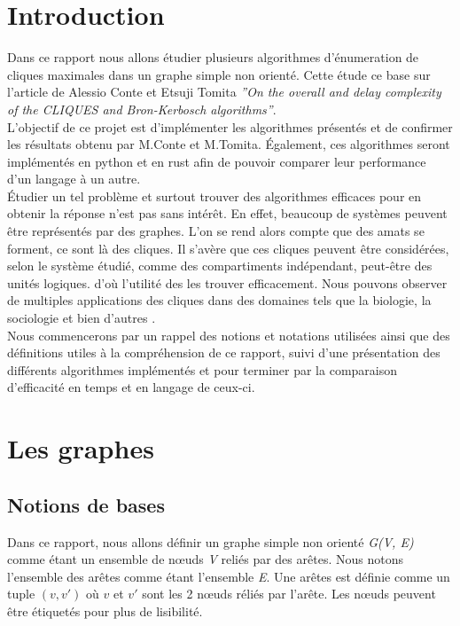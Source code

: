 \documentclass[a4paper, 12pt]{article}
\begin{document}
\tableofcontents

\newpage

\section{Introduction}


Dans ce rapport nous allons étudier plusieurs algorithmes d'énumeration de cliques maximales dans un graphe simple non orienté. Cette étude ce base sur l'article de Alessio Conte et Etsuji Tomita  \textit{''On the overall and delay complexity of the CLIQUES and Bron-Kerbosch algorithms''}. \\
L'objectif de ce projet est d'implémenter les algorithmes présentés et de confirmer les résultats obtenu par M.Conte et M.Tomita. Également, ces algorithmes seront implémentés en python et en rust afin de pouvoir comparer leur performance d'un langage à un autre. \\

Étudier un tel problème et surtout trouver des algorithmes efficaces pour en obtenir la réponse n'est pas sans intérêt. En effet, beaucoup de systèmes peuvent être représentés par des graphes. L'on se rend alors compte que des amats se forment, ce sont là des cliques. Il s'avère que ces cliques peuvent être considérées, selon le système étudié, comme des compartiments indépendant, peut-être des unités logiques. d'où l'utilité des les trouver efficacement. Nous pouvons observer de multiples applications des cliques dans des domaines tels que la biologie, la sociologie et bien d'autres \cite{use}.\\

Nous commencerons par un rappel des notions et notations utilisées ainsi que des définitions utiles à la compréhension de ce rapport, suivi d'une présentation des différents algorithmes implémentés et pour terminer par la comparaison d'efficacité en temps et en langage de ceux-ci.

\section{Les graphes}%
\label{sec:graphes}

\subsection{Notions de bases}

Dans ce rapport, nous allons définir un graphe simple non orienté \emph{G(V, E)} comme étant un ensemble de nœuds \emph{V} reliés par des arêtes. Nous notons l'ensemble des arêtes comme étant l'ensemble \emph{E}. Une arêtes est définie comme un tuple $ (v, v') $ où $ v $ et $ v' $ sont les 2 nœuds réliés par l'arête. Les nœuds peuvent être étiquetés pour plus de lisibilité. \\
\end{document}
